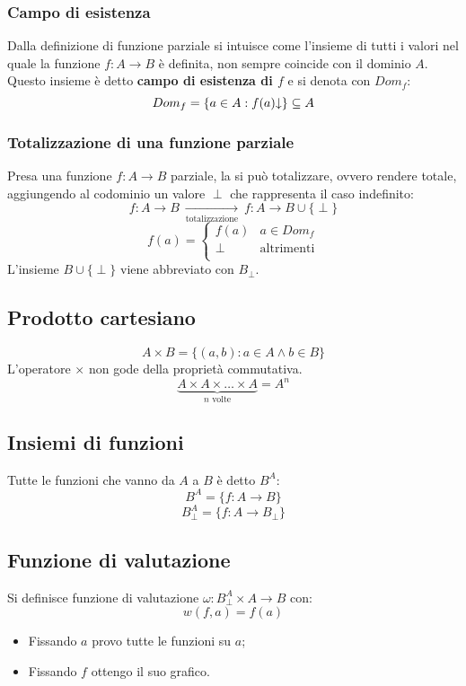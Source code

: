 \subsubsection*{Campo di esistenza}
Dalla definizione di funzione parziale si intuisce come l'insieme di tutti i valori
nel quale la funzione $f:A\rightarrow B$ è definita, non sempre coincide con il dominio
$A$. Questo insieme è detto \textbf{campo di esistenza di $f$} e si denota con $Dom_f$:
$$ Dom_f = \{ a\in A: f(a)\text{\textdownarrow} \} \subseteq  A $$

\subsubsection*{Totalizzazione di una funzione parziale}
Presa una funzione $f:A\rightarrow B$ parziale, la si può totalizzare, ovvero rendere
totale, aggiungendo al codominio un valore $\perp$ che rappresenta il caso indefinito:
$$ f:A\rightarrow B \ \underset{\text{totalizzazione}}{\longrightarrow} \ 
f:A\rightarrow B \cup \{\perp\}$$
$$ f(a) = \begin{cases}
f(a) & a\in Dom_f\\
\perp & \text{altrimenti}\\
\end{cases} $$
L'insieme $B \cup \{\perp\}$ viene abbreviato con $B_\perp$.

\subsection*{Prodotto cartesiano}
$$ A\times B = \{(a,b):a\in A \wedge b\in B\} $$
L'operatore $\times$ non gode della proprietà commutativa.
$$ \underbrace{A\times A\times\dots\times A}_{n \text{ volte}} = A^n $$

\subsection*{Insiemi di funzioni}
Tutte le funzioni che vanno da $A$ a $B$ è detto $B^A$:
$$ B^A = \{f:A\rightarrow B\} $$
$$ B^A_\perp = \{f:A\rightarrow B_\perp\} $$

\subsection*{Funzione di valutazione}
Si definisce funzione di valutazione $\omega:B_\perp^A\times A \rightarrow B$ con:
$$ w(f,a) = f(a) $$
\begin{itemize}
    \item Fissando $a$ provo tutte le funzioni su $a$;
    \item Fissando $f$ ottengo il suo grafico.
\end{itemize}

